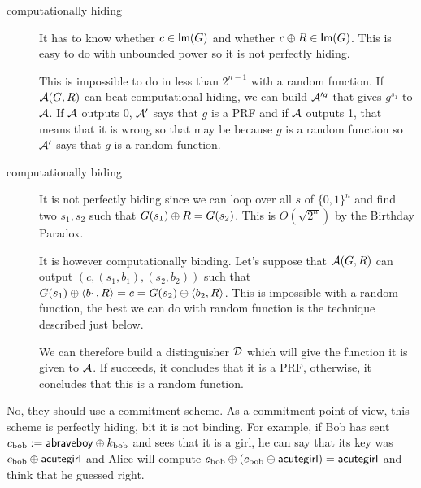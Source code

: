 \newape
\begin{solution}
  \begin{description}
    \item[computationally hiding]
      It has to know whether $c \in \operatorname{\mathsf{Im}}(G)$ and whether $c \oplus R \in \operatorname{\mathsf{Im}}(G)$.
      This is easy to do with unbounded power so it is not perfectly hiding.

      This is impossible to do in less than $2^{n-1}$ with a random function.
      If $\mathcal{A}(G,R)$ can beat computational hiding, we can build $\mathcal{A}'^g$ that gives $g^{s_1}$ to $\mathcal{A}$.
      If $\mathcal{A}$ outputs 0, $\mathcal{A}'$ says that $g$ is a PRF and if $\mathcal{A}$ outputs 1,
      that means that it is wrong so that may be because $g$ is a random function
      so $\mathcal{A}'$ says that $g$ is a random function.
    \item[computationally biding]
      It is not perfectly biding since we can loop over all $s$ of $\{0,1\}^n$ and find two $s_1,s_2$ such
      that $G(s_1) \oplus R = G(s_2)$.
      This is $O(\sqrt{2^n})$ by the Birthday Paradox.

      It is however computationally binding.
      Let's suppose that $\mathcal{A}(G,R)$ can output $(c, (s_1,b_1), (s_2, b_2))$ such that
      $G(s_1) \oplus \langle b_1,R \rangle = c = G(s_2) \oplus \langle b_2,R \rangle$.
      This is impossible with a random function, the best we can do with random function is the technique described just below.

      We can therefore build a distinguisher $\mathcal{D}$ which will give the function it is given to $\mathcal{A}$.
      If succeeds, it concludes that it is a PRF, otherwise, it concludes that this is a random function.
  \end{description}
\end{solution}

\nosolution
\nosolution

\begin{solution}
  No, they should use a commitment scheme.
  As a commitment point of view, this scheme is perfectly hiding, bit it is not binding.
  For example, if Bob has sent $c_{\text{bob}} := \mathsf{abraveboy} \oplus k_{\text{bob}}$ and sees that it is a girl,
  he can say that its key was $c_{\text{bob}} \oplus \mathsf{acutegirl}$ and Alice will
  compute $c_{\text{bob}} \oplus (c_{\text{bob}} \oplus \mathsf{acutegirl}) = \mathsf{acutegirl}$ and think that he guessed right.
\end{solution}

